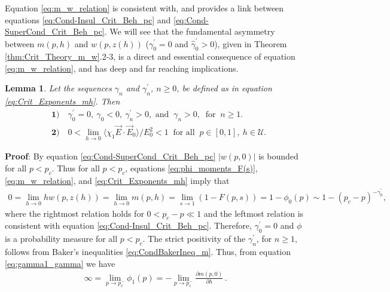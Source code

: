 \documentclass[english,12pt,jmp,graphicx]{revtex4-1}
\newtheorem{lemma}{Lemma}[section]
\newcommand{\gh}{\hat{\gamma}}
\begin{document}
Equation \eqref{eq:m_w_relation} is consistent with, and provides a
link between equations \eqref{eq:Cond-Insul_Crit_Beh_pc} and
\eqref{eq:Cond-SuperCond_Crit_Beh_pc}. We will see that the
fundamental asymmetry  between $m(p,h)$ and $w(p,z(h))$ ($\gamma_0^\prime=0$ and
$\gh_0^\prime>0$), given in Theorem \ref{thm:Crit_Theory_m_w}.2-3, is a
direct and essential consequence of equation \eqref{eq:m_w_relation},
and has deep and far reaching implications.      
%
\begin{lemma}\label{lem:zero_gamma0}
  Let the sequences $\gamma_n$ and $\gamma_n^\prime$, $n\geq0$, be defined as in
  equation \eqref{eq:Crit_Exponents_mh}. Then
  \begin{align*}
    &\mathbf{1)} \quad \gamma_0^\prime=0, \ \gamma_0<0, \ \gamma_n^\prime>0,   \text{ and } \ \gamma_n>0, \
        \text{ for } \ n\geq1. \\
    &\mathbf{2)} \quad 0<\lim_{h\to0}\langle\chi_1\vec{E}\cdot\vec{E}_0\rangle/E_0^2<1 \
         \text{ for all } \ p\in[0,1], \ h\in\mathcal{U}.
  \end{align*}
\end{lemma}
%
\noindent \textbf{Proof}:
%
By equation \eqref{eq:Cond-SuperCond_Crit_Beh_pc} $|w(p,0)|$ is  
bounded for all $p<p_c$. Thus for all $p<p_c$, equations
\eqref{eq:phi_moments_F(s)}, \eqref{eq:m_w_relation},
and \eqref{eq:Crit_Exponents_mh} imply that
%
\begin{align*}
  0=\lim_{h\to0}hw(p,z(h))=\lim_{h\to0}m(p,h)=\lim_{s\to1}(1-F(p,s))=1-\phi_0(p)\sim1-(p_c-p)^{-\gamma_0^\prime},
\end{align*}
%
where the rightmost relation holds for $0<p_c-p\ll1$ and the leftmost
relation is consistent with equation
\eqref{eq:Cond-Insul_Crit_Beh_pc}. Therefore, $\gamma_0^\prime=0$ and $\phi$ is a
probability measure for all $p<p_c$. The strict positivity of the
$\gamma_n^\prime$, for $n\geq1$, follows from Baker's inequalities
\eqref{eq:CondBakerIneq_m}. Thus, from equation
\eqref{eq:gamma1_gamma} we have 
%
\begin{align}\label{eq:div_phi1}
  \infty=\lim_{p\to p_c^-}\phi_1(p)=-\lim_{p\to p_c^-}\frac{\partial m(p,0)}{\partial h}\,.
\end{align}
%
\end{document}

